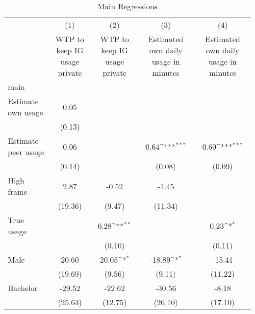 \begin{table}[htbp]\centering
\def\sym#1{\ifmmode^{#1}\else\(^{#1}\)\fi}
\caption{Main Regressions}
\begin{tabular}{l*{4}{c}}
\hline\hline
                    &\multicolumn{1}{c}{(1)}&\multicolumn{1}{c}{(2)}&\multicolumn{1}{c}{(3)}&\multicolumn{1}{c}{(4)}\\
                    &\multicolumn{1}{c}{WTP to keep IG usage private}&\multicolumn{1}{c}{WTP to keep IG usage private}&\multicolumn{1}{c}{Estimated own daily usage in minutes}&\multicolumn{1}{c}{Estimated own daily usage in minutes}\\
\hline
main                &                     &                     &                     &                     \\
Estimate own usage  &        0.05         &                     &                     &                     \\
                    &      (0.13)         &                     &                     &                     \\
[1em]
Estimate peer usage &        0.06         &                     &        0.64\sym{***}&        0.60\sym{***}\\
                    &      (0.14)         &                     &      (0.08)         &      (0.09)         \\
[1em]
High frame          &        2.87         &       -0.52         &       -1.45         &                     \\
                    &     (19.36)         &      (9.47)         &     (11.34)         &                     \\
[1em]
True usage          &                     &        0.28\sym{**} &                     &        0.23\sym{*}  \\
                    &                     &      (0.10)         &                     &      (0.11)         \\
[1em]
Male                &       20.60         &       20.05\sym{*}  &      -18.89\sym{*}  &      -15.41         \\
                    &     (19.69)         &      (9.56)         &      (9.11)         &     (11.22)         \\
[1em]
Bachelor            &      -29.52         &      -22.62         &      -30.56         &       -8.18         \\
                    &     (25.63)         &     (12.75)         &     (26.10)         &     (17.10)         \\

\end{tabular}
\end{table}
